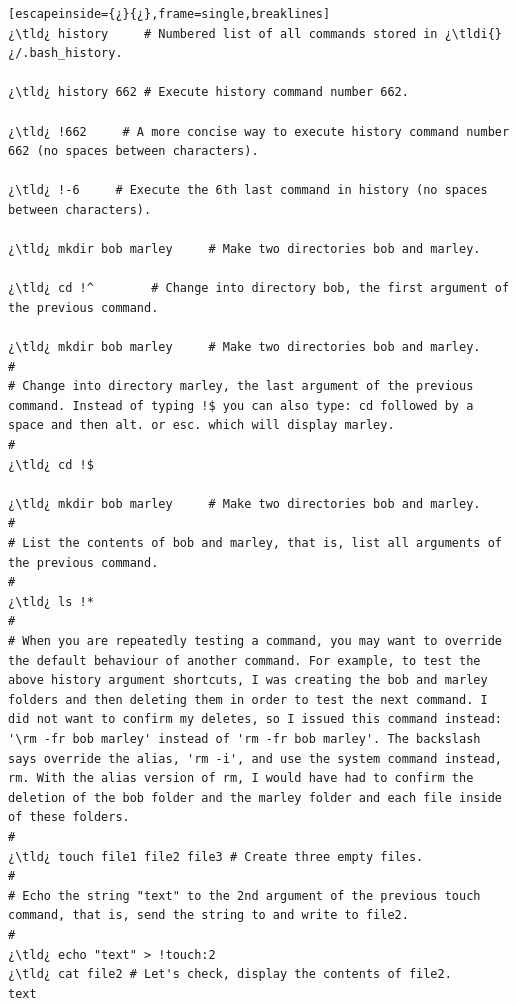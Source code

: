 \begin{lstlisting}[escapeinside={¿}{¿},frame=single,breaklines]
¿\tld¿ history     # Numbered list of all commands stored in ¿\tldi{}¿/.bash_history.

¿\tld¿ history 662 # Execute history command number 662.

¿\tld¿ !662     # A more concise way to execute history command number 662 (no spaces between characters).

¿\tld¿ !-6     # Execute the 6th last command in history (no spaces between characters).

¿\tld¿ mkdir bob marley		# Make two directories bob and marley.

¿\tld¿ cd !^		# Change into directory bob, the first argument of the previous command.

¿\tld¿ mkdir bob marley		# Make two directories bob and marley.
#
# Change into directory marley, the last argument of the previous command. Instead of typing !$ you can also type: cd followed by a space and then alt. or esc. which will display marley.
#
¿\tld¿ cd !$	

¿\tld¿ mkdir bob marley		# Make two directories bob and marley.
#
# List the contents of bob and marley, that is, list all arguments of the previous command.
#
¿\tld¿ ls !*	
#
# When you are repeatedly testing a command, you may want to override the default behaviour of another command. For example, to test the above history argument shortcuts, I was creating the bob and marley folders and then deleting them in order to test the next command. I did not want to confirm my deletes, so I issued this command instead: '\rm -fr bob marley' instead of 'rm -fr bob marley'. The backslash says override the alias, 'rm -i', and use the system command instead, rm. With the alias version of rm, I would have had to confirm the deletion of the bob folder and the marley folder and each file inside of these folders.
#
¿\tld¿ touch file1 file2 file3 # Create three empty files.
#
# Echo the string "text" to the 2nd argument of the previous touch command, that is, send the string to and write to file2.
#
¿\tld¿ echo "text" > !touch:2 
¿\tld¿ cat file2 # Let's check, display the contents of file2.
text


\end{lstlisting}
